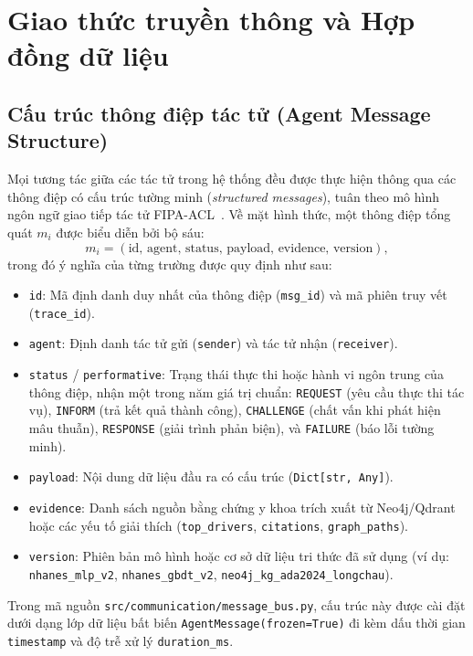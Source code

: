 \chapter{Giao thức truyền thông và Hợp đồng dữ liệu}
\label{chap:contracts}

\section{Cấu trúc thông điệp tác tử (Agent Message Structure)}
\label{sec:message-structure}

Mọi tương tác giữa các tác tử trong hệ thống đều được thực hiện thông qua các thông điệp có cấu trúc tường minh (\emph{structured messages}), tuân theo mô hình ngôn ngữ giao tiếp tác tử FIPA-ACL~\cite{fipa2002}. Về mặt hình thức, một thông điệp tổng quát $m_i$ được biểu diễn bởi bộ sáu:
\begin{equation}
  m_i = (\text{id},\, \text{agent},\, \text{status},\, \text{payload},\, \text{evidence},\, \text{version}),
  \label{eq:message-tuple}
\end{equation}
trong đó ý nghĩa của từng trường được quy định như sau:
\begin{itemize}
  \item \texttt{id}: Mã định danh duy nhất của thông điệp (\texttt{msg\_id}) và mã phiên truy vết (\texttt{trace\_id}).
  \item \texttt{agent}: Định danh tác tử gửi (\texttt{sender}) và tác tử nhận (\texttt{receiver}).
  \item \texttt{status} / \texttt{performative}: Trạng thái thực thi hoặc hành vi ngôn trung của thông điệp, nhận một trong năm giá trị chuẩn: \texttt{REQUEST} (yêu cầu thực thi tác vụ), \texttt{INFORM} (trả kết quả thành công), \texttt{CHALLENGE} (chất vấn khi phát hiện mâu thuẫn), \texttt{RESPONSE} (giải trình phản biện), và \texttt{FAILURE} (báo lỗi tường minh).
  \item \texttt{payload}: Nội dung dữ liệu đầu ra có cấu trúc (\texttt{Dict[str, Any]}).
  \item \texttt{evidence}: Danh sách nguồn bằng chứng y khoa trích xuất từ Neo4j/Qdrant hoặc các yếu tố giải thích (\texttt{top\_drivers}, \texttt{citations}, \texttt{graph\_paths}).
  \item \texttt{version}: Phiên bản mô hình hoặc cơ sở dữ liệu tri thức đã sử dụng (ví dụ: \texttt{nhanes\_mlp\_v2}, \texttt{nhanes\_gbdt\_v2}, \texttt{neo4j\_kg\_ada2024\_longchau}).
\end{itemize}

Trong mã nguồn \texttt{src/communication/message\_bus.py}, cấu trúc này được cài đặt dưới dạng lớp dữ liệu bất biến \texttt{AgentMessage(frozen=True)} đi kèm dấu thời gian \texttt{timestamp} và độ trễ xử lý \texttt{duration\_ms}.

